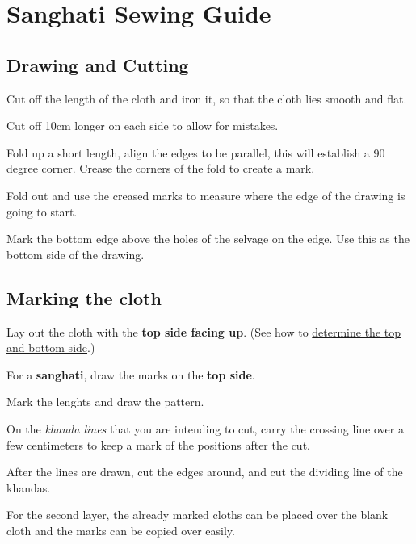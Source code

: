 \chapter{Sanghati Sewing Guide}

\section{Drawing and Cutting}

Cut off the length of the cloth and iron it, so that the cloth lies
smooth and flat.

Cut off 10cm longer on each side to allow for mistakes.

Fold up a short length, align the edges to be parallel, this will
establish a 90 degree corner. Crease the corners of the fold to create a
mark.

\setlength{\nextPhotoWidth}{0.5\textwidth}


Fold out and use the creased marks to measure where the edge of the
drawing is going to start.

Mark the bottom edge above the holes of the selvage on the edge. Use
this as the bottom side of the drawing.

\clearpage

\section{Marking the cloth}

Lay out the cloth with the \textbf{top side facing up}. (See how to
\href{/en/sabong-guide\#determine-the-top-and-bottom-side}{determine the
top and bottom side}.)

For a \textbf{sanghati}, draw the marks on the \textbf{top side}.

Mark the lenghts and draw the pattern.

On the \emph{khanda lines} that you are intending to cut, carry the
crossing line over a few centimeters to keep a mark of the positions
after the cut.

\setlength{\nextPhotoWidth}{0.5\textwidth}


After the lines are drawn, cut the edges around, and cut the dividing
line of the khandas.

For the second layer, the already marked cloths can be placed over the
blank cloth and the marks can be copied over easily.

